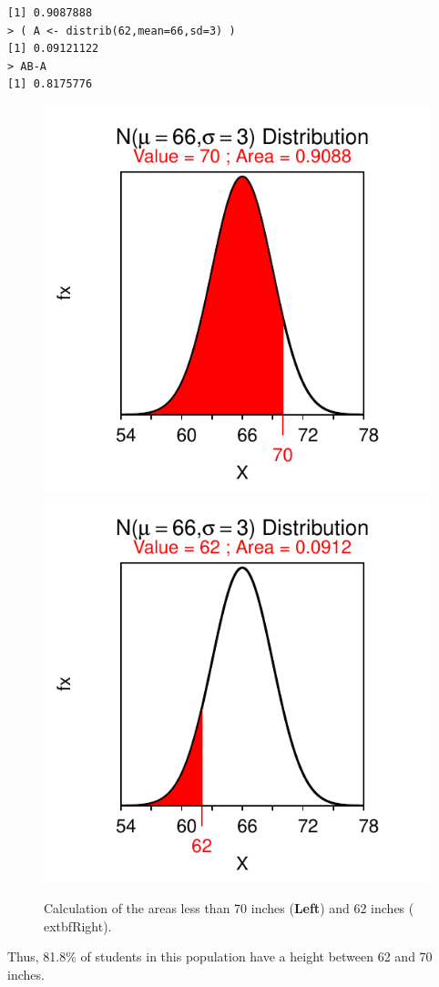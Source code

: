 \documentclass[10pt,openany]{book}\usepackage[]{graphicx}\usepackage[]{color}
\makeatletter
\newenvironment{kframe}{%
 \def\at@end@of@kframe{}%
 \ifinner\ifhmode%
  \def\at@end@of@kframe{\end{minipage}}%
  \begin{minipage}{\columnwidth}%
 \fi\fi%
 \def\FrameCommand##1{\hskip\@totalleftmargin \hskip-\fboxsep
 \colorbox{shadecolor}{##1}\hskip-\fboxsep
     \hskip-\linewidth \hskip-\@totalleftmargin \hskip\columnwidth}%
 \MakeFramed {\advance\hsize-\width
   \@totalleftmargin\z@ \linewidth\hsize
   \@setminipage}}%
 {\par\unskip\endMakeFramed%
 \at@end@of@kframe}
\newenvironment{knitrout}{}{} %
\makeatother
\begin{document}
\begin{knitrout}
\color{fgcolor}\begin{kframe}
\begin{verbatim}
[1] 0.9087888
> ( A <- distrib(62,mean=66,sd=3) )
[1] 0.09121122
> AB-A
[1] 0.8175776
\end{verbatim}
\end{kframe}\begin{figure}[hbtp]

{\centering \includegraphics[width=.4\linewidth]{Figs/NormZCalc3-1} 
\includegraphics[width=.4\linewidth]{Figs/NormZCalc3-2} 

}

\caption[Calculation of the areas less than 70 inches (\textbf{Left}) and 62 inches (	extbf{Right})]{Calculation of the areas less than 70 inches (\textbf{Left}) and 62 inches (	extbf{Right}).}\label{fig:NormZCalc3}
\end{figure}


\end{knitrout}

Thus, 81.8\% of students in this population have a height between 62 and 70 inches.

\end{document}
